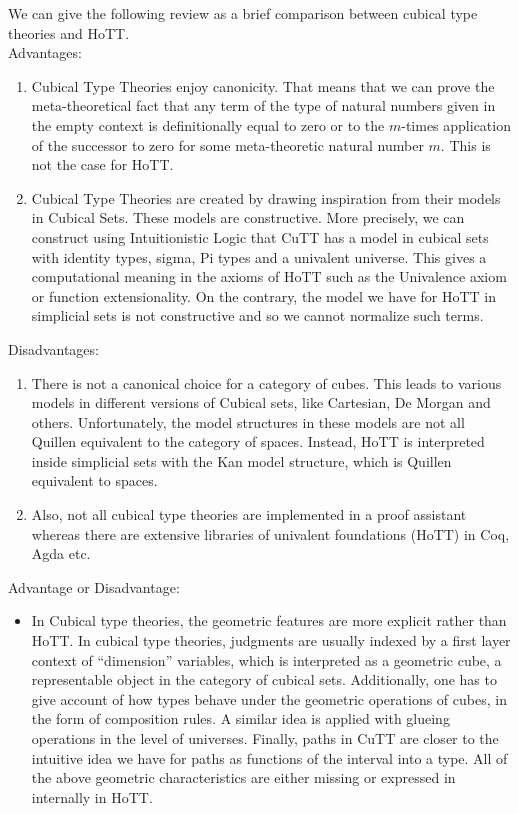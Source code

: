 \documentclass{article}
\theoremstyle{definition}
\begin{document}
We can give the following review as a brief comparison
between cubical type theories and HoTT. \\
Advantages:
\begin{enumerate}
 \item Cubical Type Theories enjoy canonicity. That means
 that we can prove the meta-theoretical fact that
 any term of the type of natural numbers given in
 the empty context is definitionally equal to
 zero or to the $m$-times application of the successor
 to zero for some meta-theoretic natural number $m$.
 This is not the case for HoTT.
 \item Cubical Type Theories are created by drawing
 inspiration from their models in Cubical Sets.
 These models are constructive. More precisely,
 we can construct using Intuitionistic Logic
 that CuTT has a model in cubical sets with
 identity types, sigma, Pi types and a univalent
 universe. This gives a computational meaning
 in the axioms of HoTT such as the Univalence
 axiom or function extensionality. On the contrary,
 the model we have for HoTT in simplicial sets
 is not constructive and so we cannot normalize
 such terms.
\end{enumerate}
Disadvantages:
\begin{enumerate}
 \item There is not a canonical choice for a
 category of cubes. This leads to various
 models in different versions of Cubical sets,
 like Cartesian, De Morgan and others.
 Unfortunately, the model structures in these
 models are not all Quillen equivalent to
 the category of spaces. Instead, HoTT
 is interpreted inside simplicial sets
 with the Kan model structure, which is
 Quillen equivalent to spaces.
 \item Also, not all cubical type theories
 are implemented in a proof assistant
 whereas there are extensive libraries of
 univalent foundations (HoTT) in Coq, Agda etc.
\end{enumerate}
Advantage or Disadvantage:
\begin{itemize}
 \item In Cubical type theories, the geometric
 features are more explicit rather than HoTT.
 In cubical type theories, judgments are usually
 indexed by a first layer context of ``dimension''
 variables, which is interpreted as a geometric
 cube, a representable object in the category
 of cubical sets. Additionally, one has to give
 account of how types behave under the geometric
 operations of cubes, in the form of composition
 rules. A similar idea is applied with
 glueing operations in the level of universes.
 Finally, paths in CuTT are closer to the
 intuitive idea we have for paths
 as functions of the interval into a type.
 All of the above geometric characteristics are
 either missing or expressed in internally in HoTT.
\end{itemize}
\end{document}
